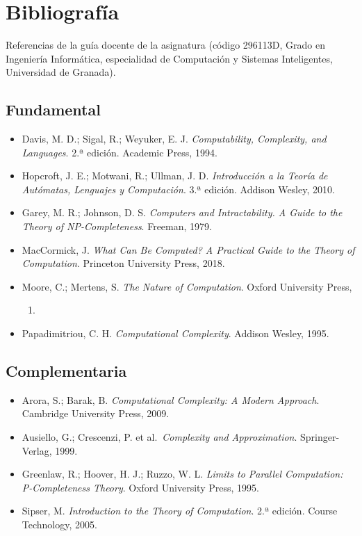 \documentclass[12pt]{book} %
\providecommand{\tightlist}{%
  \setlength{\itemsep}{0pt}\setlength{\parskip}{0pt}}
\begin{document}
\hypertarget{bibliografuxeda}{%
\chapter{Bibliografía}\label{bibliografuxeda}}

Referencias de la guía docente de la asignatura (código 296113D, Grado
en Ingeniería Informática, especialidad de Computación y Sistemas
Inteligentes, Universidad de Granada).

\hypertarget{fundamental}{%
\section{Fundamental}\label{fundamental}}

\begin{itemize}
\tightlist
\item
  Davis, M. D.; Sigal, R.; Weyuker, E. J. \emph{Computability,
  Complexity, and Languages}. 2.ª edición. Academic Press, 1994.
\item
  Hopcroft, J. E.; Motwani, R.; Ullman, J. D. \emph{Introducción a la
  Teoría de Autómatas, Lenguajes y Computación}. 3.ª edición. Addison
  Wesley, 2010.
\item
  Garey, M. R.; Johnson, D. S. \emph{Computers and Intractability. A
  Guide to the Theory of NP-Completeness}. Freeman, 1979.
\item
  MacCormick, J. \emph{What Can Be Computed? A Practical Guide to the
  Theory of Computation}. Princeton University Press, 2018.
\item
  Moore, C.; Mertens, S. \emph{The Nature of Computation}. Oxford
  University Press,

  \begin{enumerate}
  \def\labelenumi{\arabic{enumi}.}
  \setcounter{enumi}{2010}
  \tightlist
  \item
  \end{enumerate}
\item
  Papadimitriou, C. H. \emph{Computational Complexity}. Addison Wesley,
  1995.
\end{itemize}

\hypertarget{complementaria}{%
\section{Complementaria}\label{complementaria}}

\begin{itemize}
\tightlist
\item
  Arora, S.; Barak, B. \emph{Computational Complexity: A Modern
  Approach}. Cambridge University Press, 2009.
\item
  Ausiello, G.; Crescenzi, P. et al.~\emph{Complexity and
  Approximation}. Springer-Verlag, 1999.
\item
  Greenlaw, R.; Hoover, H. J.; Ruzzo, W. L. \emph{Limits to Parallel
  Computation: P-Completeness Theory}. Oxford University Press, 1995.
\item
  Sipser, M. \emph{Introduction to the Theory of Computation}. 2.ª
  edición. Course Technology, 2005.
\end{itemize}


\end{document}
